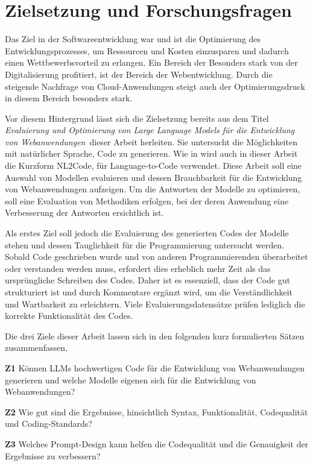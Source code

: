 

\section{Zielsetzung und Forschungsfragen}
\label{sec:goals_of_the_work}
Das Ziel in der Softwareentwicklung war und ist die Optimierung des Entwicklungsprozesses, um Ressourcen und Kosten einzusparen und dadurch einen Wettbewerbsvorteil zu erlangen. Ein Bereich der Besonders stark von der Digitalisierung profitiert, ist der Bereich der Webentwicklung. Durch die steigende Nachfrage von Cloud-Anwendungen steigt auch der Optimierungsdruck in diesem Bereich besonders stark.\vspace{0.2cm}

Vor diesem Hintergrund lässt sich die Zielsetzung bereits aus dem Titel \glqq \textit{Evaluierung und Optimierung von Large Language Models für die Entwicklung von Webanwendungen}\grqq \ dieser Arbeit herleiten. Sie untersucht die Möglichkeiten mit natürlicher Sprache, Code zu generieren. Wie in \cite[vgl. Seite 2]{jiang-2024} wird auch in dieser Arbeit die Kurzform NL2Code, für Language-to-Code verwendet. Diese Arbeit soll eine Auswahl von Modellen evaluieren und dessen Brauchbarkeit für die Entwicklung von Webanwendungen aufzeigen. Um die Antworten der Modelle zu optimieren, soll eine Evaluation von Methodiken erfolgen, bei der deren Anwendung eine Verbesserung der Antworten ersichtlich ist.\vspace{0.2cm}

Als erstes Ziel soll jedoch die Evaluierung des generierten Codes der Modelle stehen und dessen Tauglichkeit für die Programmierung untersucht werden. Sobald Code geschrieben wurde und von anderen Programmierenden überarbeitet oder verstanden werden muss, erfordert dies erheblich mehr Zeit als das ursprüngliche Schreiben des Codes. Daher ist es essenziell, dass der Code gut strukturiert ist und durch Kommentare ergänzt wird, um die Verständlichkeit und Wartbarkeit zu erleichtern. Viele Evaluierungsdatensätze prüfen lediglich die korrekte Funktionalität des Codes.\vspace{0.2cm}

Die drei Ziele dieser Arbeit lassen sich in den folgenden kurz formulierten Sätzen zusammenfassen,

\begin{myitemize}
	\item[\textbf{Z1}] Können LLMs hochwertigen Code für die Entwicklung von Webanwendungen generieren und welche Modelle eigenen sich für die Entwicklung von Webanwendungen?
	\item[\textbf{Z2}] Wie gut sind die Ergebnisse, hinsichtlich Syntax, Funktionalität, Codequalität und Coding-Standards?
	\item[\textbf{Z3}] Welches Prompt-Design kann helfen die Codequalität und die Genauigkeit der Ergebnisse zu verbessern?
\end{myitemize}

